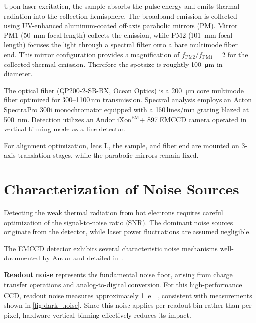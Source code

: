 \documentclass[
	parskip=half,
	a4paper,
]{scrarticle}
\begin{document}
Upon laser excitation, the sample absorbs the pulse energy and emits thermal radiation into the collection hemisphere. The broadband emission is collected using UV-enhanced aluminum-coated off-axis parabolic mirrors (PM). Mirror PM1 (\SI{50}{mm} focal length) collects the emission, while PM2 (\SI{101}{mm} focal length) focuses the light through a spectral filter onto a bare multimode fiber end.
This mirror configuration provides a magnification of $f_\text{PM2}/f_\text{PM1} = 2$ for the collected thermal emission. Therefore the spotsize is roughtly \SI{100}{\micro m} in diameter.

The optical fiber (QP200-2-SR-BX, Ocean Optics) is a \SI{200}{\micro m} core multimode fiber optimized for 300--1100\,nm transmission. Spectral analysis employs an Acton SpectraPro 300i monochromator equipped with a 150\,lines/mm grating blazed at \SI{500}{nm}. Detection utilizes an Andor iXon$^\text{EM}$+ 897 EMCCD camera operated in vertical binning mode as a line detector.

For alignment optimization, lens L, the sample, and fiber end are mounted on 3-axis translation stages, while the parabolic mirrors remain fixed.

\section{Characterization of Noise Sources}

Detecting the weak thermal radiation from hot electrons requires careful optimization of the signal-to-noise ratio (SNR). The dominant noise sources originate from the detector, while laser power fluctuations are assumed negligible.

The EMCCD detector exhibits several characteristic noise mechanisms well-documented by Andor \cite{andor_establishing_nodate,dr_jo_walters_sensitivity_2023} and detailed in \cite{european_machine_vision_association_standard_2010}.

\textbf{Readout noise} represents the fundamental noise floor, arising from charge transfer operations and analog-to-digital conversion. For this high-performance CCD, readout noise measures approximately \SI{1}{e^-} \cite{andor_ixonem_nodate}, consistent with measurements shown in \autoref{fig:dark_noise}. Since this noise applies per readout bin rather than per pixel, hardware vertical binning effectively reduces its impact.
\end{document}
